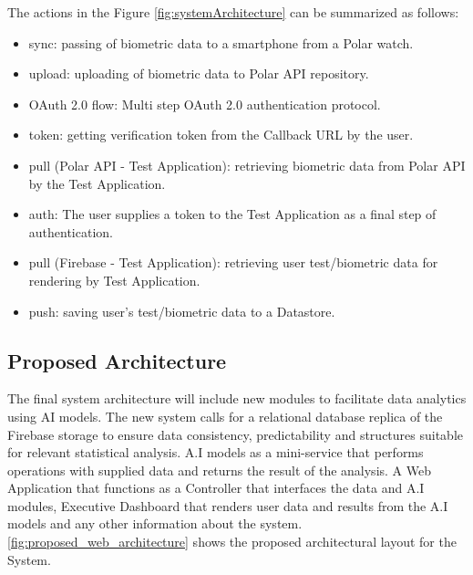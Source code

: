 \documentclass{report}
\begin{document}
The actions in the Figure \autoref{fig:systemArchitecture} can be summarized as follows:
\begin{itemize}
\item{sync}: passing of biometric data to a smartphone from a Polar watch.
\item {upload}: uploading of biometric data to Polar API repository.
\item {OAuth 2.0 flow}: Multi step OAuth 2.0 authentication protocol. 
\item {token}: getting verification token from the Callback URL by the user.
\item {pull (Polar API - Test Application)}: retrieving biometric data from Polar API by the Test Application.
\item {auth}: The user supplies a token to the Test Application as a final step of authentication. 
\item {pull (Firebase - Test Application)}: retrieving user test/biometric data for rendering by Test Application.
\item {push}: saving user's test/biometric data to a Datastore.
\end{itemize}


\subsection*{Proposed Architecture}
The final system architecture will include new modules to facilitate data analytics using AI models. The new system calls for a relational database replica of the Firebase storage to ensure data consistency, predictability and structures suitable for relevant statistical analysis. A.I models as a mini-service that performs operations with supplied data and returns the result of the analysis. A Web Application that functions as a Controller that interfaces the data and A.I modules, Executive Dashboard that renders user data and results from the A.I models and any other information about the system.\\
\autoref{fig:proposed_web_architecture} shows the proposed architectural layout for the System.\\
\end{document}
